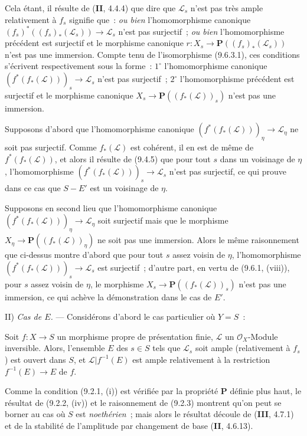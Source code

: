 
Cela étant, il résulte de (\textbf{II}, 4.4.4) que dire que $\mathcal L_s$
n'est pas très ample relativement à $f_s$ signifie que~: \emph{ou bien}
l'homomorphisme canonique
$(f_s)^*((f_s)_*(\mathcal L_s))\to\mathcal L_s$ n'est pas surjectif~; \emph{ou
bien} l'homomorphisme précédent est surjectif et le morphisme canonique
$r:X_s\to\mathbf P((f_s)_*(\mathcal L_s))$ n'est pas une immersion. Compte
tenu de l'isomorphisme (9.6.3.1), ces conditions s'écrivent respectivement sous
la forme~: $1^\circ$ l'homomorphisme canonique
$(f^*(f_*(\mathcal L)))_s\to\mathcal L_s$ n'est pas surjectif~; $2^\circ$
l'homomorphisme précédent est surjectif et le morphisme canonique
$X_s\to\mathbf P((f_*(\mathcal L))_s)$ n'est pas une immersion.

Supposons d'abord que l'homomorphisme canonique
$(f^*(f_*(\mathcal L)))_\eta\to\mathcal L_\eta$ ne soit pas surjectif. Comme
$f_*(\mathcal L)$ est cohérent, il en est de même de $f^*(f_*(\mathcal L))$,
et alors il résulte de (9.4.5) que pour tout $s$ dans un voisinage de $\eta$,
l'homomorphisme $(f^*(f_*(\mathcal L)))_s\to\mathcal L_s$ n'est pas
surjectif, ce qui prouve dans ce cas que $S-E'$ est un voisinage de $\eta$.

Supposons en second lieu que l'homomorphisme canonique
$(f^*(f_*(\mathcal L)))_\eta\to\mathcal L_\eta$ soit surjectif mais que le
morphisme $X_\eta\to\mathbf P((f_*(\mathcal L))_\eta)$ ne soit pas une
immersion. Alors le même raisonnement que ci-dessus montre d'abord que pour
tout $s$ assez voisin de $\eta$, l'homomorphisme
$(f^*(f_*(\mathcal L)))_s\to\mathcal L_s$ est surjectif~; d'autre part, en
vertu de (9.6.1, (viii)), pour $s$ assez voisin de $\eta$, le morphisme
$X_s\to\mathbf P((f_*(\mathcal L))_s)$ n'est pas une immersion, ce qui achève
la démonstration dans le cas de $E'$.

II) \emph{Cas de $E$.} --- Considérons d'abord le cas particulier où $Y=S$~:

\begin{corollary}[9.6.4]
\label{IV.9.6.4-fr}
Soit $f:X\to S$ un morphisme propre de présentation finie, $\mathcal L$ un
$\mathcal O_X$-Module inversible. Alors, l'ensemble $E$ des $s\in S$ tels que
$\mathcal L_s$ soit ample (relativement à $f_s$) est ouvert dans $S$, et
$\mathcal L|f^{-1}(E)$ est ample relativement à la restriction
$f^{-1}(E)\to E$ de $f$.
\end{corollary}

Comme la condition (9.2.1, (i)) est vérifiée par la propriété $\mathbf P$ définie plus
haut, le résultat de (9.2.2, (iv)) et le raisonnement de (9.2.3) montrent qu'on
peut se borner au cas où $S$ est \emph{noethérien}~; mais alors le résultat
découle de (\textbf{III}, 4.7.1) et de la stabilité de l'amplitude par
changement de base (\textbf{II}, 4.6.13).

